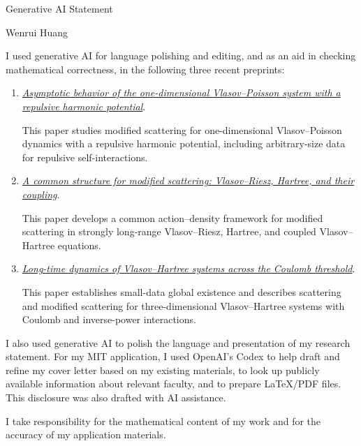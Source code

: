 \documentclass[11pt]{article}
\begin{document}
\begin{center}
{\LARGE Generative AI Statement}\par
\vspace{0.4em}
{\large Wenrui Huang}
\end{center}

\vspace{1.0em}

I used generative AI for language polishing and editing, and as an aid in checking mathematical correctness, in the following three recent preprints:

\begin{enumerate}
\item \href{https://arxiv.org/abs/2610.02551}{\emph{Asymptotic behavior of the one-dimensional Vlasov--Poisson system with a repulsive harmonic potential}}.\par
This paper studies modified scattering for one-dimensional Vlasov--Poisson dynamics with a repulsive harmonic potential, including arbitrary-size data for repulsive self-interactions.

\item \href{https://arxiv.org/abs/2610.02643}{\emph{A common structure for modified scattering: Vlasov--Riesz, Hartree, and their coupling}}.\par
This paper develops a common action--density framework for modified scattering in strongly long-range Vlasov--Riesz, Hartree, and coupled Vlasov--Hartree equations.

\item \href{https://arxiv.org/abs/2608.04402}{\emph{Long-time dynamics of Vlasov--Hartree systems across the Coulomb threshold}}.\par
This paper establishes small-data global existence and describes scattering and modified scattering for three-dimensional Vlasov--Hartree systems with Coulomb and inverse-power interactions.
\end{enumerate}

I also used generative AI to polish the language and presentation of my research statement. For my MIT application, I used OpenAI's Codex to help draft and refine my cover letter based on my existing materials, to look up publicly available information about relevant faculty, and to prepare LaTeX/PDF files. This disclosure was also drafted with AI assistance.

I take responsibility for the mathematical content of my work and for the accuracy of my application materials.
\end{document}
